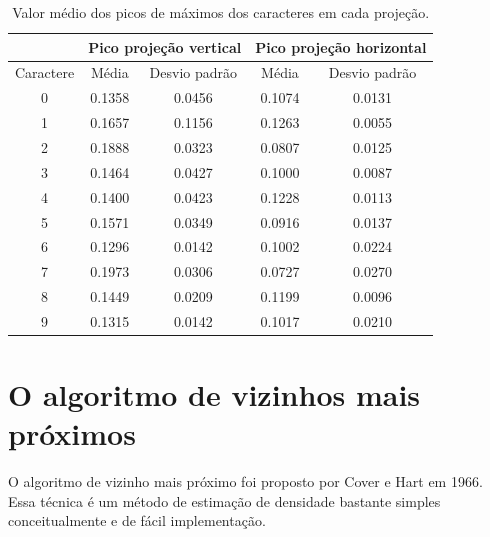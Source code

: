 \documentclass[letterpaper, 10 pt, conference]{ieeeconf}  %
\begin{document}
\begin{table}[h]
\centering
\begin{tabular}{|c|c|c|c|c|}
\hline
          & \multicolumn{2}{c|}{Pico projeção vertical} & \multicolumn{2}{c|}{Pico projeção horizontal} \\ \hline
Caractere & Média             & Desvio padrão           & Média              & Desvio padrão            \\ \hline
0         & 0.1358            & 0.0456                  & 0.1074             & 0.0131                   \\ \hline
1         & 0.1657            & 0.1156                  & 0.1263             & 0.0055                   \\ \hline
2         & 0.1888            & 0.0323                  & 0.0807             & 0.0125                   \\ \hline
3         & 0.1464            & 0.0427                  & 0.1000             & 0.0087                   \\ \hline
4         & 0.1400            & 0.0423                  & 0.1228             & 0.0113                   \\ \hline
5         & 0.1571            & 0.0349                  & 0.0916             & 0.0137                   \\ \hline
6         & 0.1296            & 0.0142                  & 0.1002             & 0.0224                   \\ \hline
7         & 0.1973            & 0.0306                  & 0.0727             & 0.0270                   \\ \hline
8         & 0.1449            & 0.0209                  & 0.1199             & 0.0096                   \\ \hline
9         & 0.1315            & 0.0142                  & 0.1017             & 0.0210                   \\ \hline
\end{tabular}
\caption{Valor médio dos picos de máximos dos caracteres em cada projeção.}
\end{table}



\section{O algoritmo de vizinhos mais próximos}

O algoritmo de vizinho mais próximo foi proposto por Cover e Hart em 1966. Essa
técnica é um método de estimação de densidade bastante simples conceitualmente e
de fácil implementação.
\end{document}
